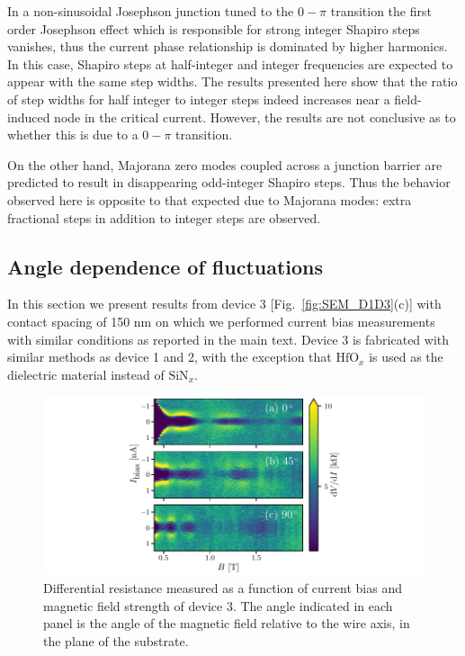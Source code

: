 In a non-sinusoidal Josephson junction tuned to the $0-\pi$ transition the first order Josephson effect which is responsible for strong integer Shapiro steps vanishes, thus the current phase relationship is dominated by higher harmonics.
In this case, Shapiro steps at half-integer and integer frequencies are expected to appear with the same step widths.
The results presented here show that the ratio of step widths for half integer to integer steps indeed increases near a field-induced node in the critical current.
However, the results are not conclusive as to whether this is due to a $0-\pi$ transition.

On the other hand, Majorana zero modes coupled across a junction barrier are predicted to result in disappearing odd-integer Shapiro steps\cite{Lutchyn2010,Oreg2010}.
Thus the behavior observed here is opposite to that expected due to Majorana modes: extra fractional steps in addition to integer steps are observed.

\subsection{Angle dependence of fluctuations}

In this section we present results from device 3 [Fig.~\ref{fig:SEM_D1D3}(c)] with contact spacing of 150 nm on which we performed current bias measurements with similar conditions as reported in the main text.
Device 3 is fabricated with similar methods as device 1 and 2, with the exception that $\text{HfO}_x$ is used as the dielectric material instead of $\text{SiN}_x$.

\begin{figure}
\begin{center}
\includegraphics[width=\columnwidth]{chapter_supercurrent/figures/sup_fig3}
\caption{Differential resistance measured as a function of current bias and magnetic field strength of device 3.
The angle indicated in each panel is the angle of the magnetic field relative to the wire axis, in the plane of the substrate.}
\label{fig:angle_dependence}
\end{center}
\end{figure}

